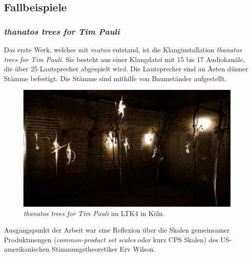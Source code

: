 \documentclass[12pt,a4paper,ngerman]{article}
\begin{document}

%



\subsection{Fallbeispiele}

\subsubsection{\emph{thanatos trees for Tim Pauli}}
\label{thanatosTreesChapter}

Das erste Werk, welches mit \emph{mutwo} entstand, ist die Klanginstallation \emph{thanatos trees for Tim Pauli}.
Sie besteht aus einer Klangdatei mit 15 bis 17 Audiokanäle, die über 25 Lautsprecher abgespielt wird.
Die Lautsprecher sind an Ästen dünner Stämme befestigt.
Die Stämme sind mithilfe von Baumständer aufgestellt.

\begin{figure}[h!]
    \includegraphics[scale=0.28]{pictures/ltk4_open_call_2021_6.jpg}

    \caption{%
        \emph{thanatos trees for Tim Pauli} im LTK4 in Köln.
    }
\end{figure}

Ausgangspunkt der Arbeit war eine Reflexion über die Skalen gemeinsamer Produktmengen (\emph{common-product set scales} oder kurz CPS Skalen) des US-amerikanischen Stimmungstheoretiker Erv Wilson.
\end{document}
